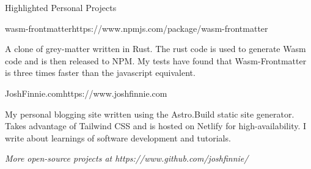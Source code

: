 \documentclass{bluefin_cv}
\begin{document}
\begin{bfcvSection}{Highlighted Personal Projects}

\begin{bfcvProjSubsection}{wasm-frontmatter}{https://www.npmjs.com/package/wasm-frontmatter}
\item A clone of grey-matter written in Rust. The rust code is used to generate Wasm code and is then released to NPM. My tests have found that Wasm-Frontmatter is three times faster than the javascript equivalent.
\end{bfcvProjSubsection}


\begin{bfcvProjSubsection}{JoshFinnie.com}{https://www.joshfinnie.com}
\item My personal blogging site written using the Astro.Build static site generator. Takes advantage of Tailwind CSS and is hosted on Netlify for high-availability. I write about learnings of software development and tutorials.
\end{bfcvProjSubsection}

\smallskip
\centerline{\textsl{More open-source projects at https://www.github.com/joshfinnie/}}

\end{bfcvSection}
\end{document}
